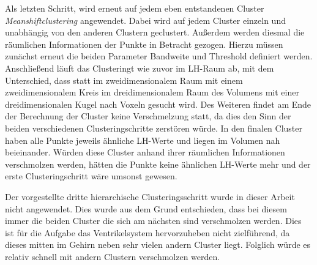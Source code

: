 Als letzten Schritt, wird erneut auf jedem eben entstandenen Cluster \textit{Meanshiftclustering} angewendet. Dabei wird auf jedem Cluster einzeln und unabhängig von den anderen Clustern geclustert. Außerdem werden diesmal die räumlichen Informationen der Punkte in Betracht gezogen.
\newline
Hierzu müssen zunächst erneut die beiden Parameter Bandweite und Threshold definiert werden.
\newline
Anschließend läuft das Clusteringt wie zuvor im LH-Raum ab, mit dem Unterschied, dass statt im zweidimensionalem Raum mit einem zweidimensionalem Kreis im dreidimensionalem Raum des Volumens mit einer dreidimensionalen Kugel nach Voxeln gesucht wird.
\newline
Des Weiteren findet am Ende der Berechnung der Cluster keine Verschmelzung statt, da dies den Sinn der beiden verschiedenen Clusteringschritte zerstören würde. In den finalen Cluster haben alle Punkte jeweils ähnliche LH-Werte und liegen im Volumen nah beieinander.
\newline
Würden diese Cluster anhand ihrer räumlichen Informationen verschmolzen werden, hätten die Punkte keine ähnlichen LH-Werte mehr und der erste Clusteringschritt wäre umsonst gewesen.




Der vorgestellte dritte hierarchische Clusteringsschritt wurde in dieser Arbeit nicht angewendet. Dies wurde aus dem Grund entschieden, dass bei diesem immer die beiden Cluster die sich am nächsten sind verschmolzen werden. Dies ist für die Aufgabe das Ventrikelsystem hervorzuheben nicht zielführend, da dieses mitten im Gehirn neben sehr vielen andern Cluster liegt. Folglich würde es relativ schnell mit andern Clustern verschmolzen werden.

